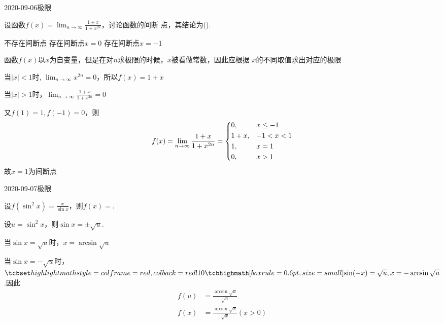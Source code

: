 \documentclass{ctexart}
\begin{document}
\begin{mathques}{2020-09-06}{极限}
\begin{ques}
  设函数$f(x) = \lim_{n \to \infty} \frac{1 + x}{1 + x^{2n}}$，讨论函数的间断
  点，其结论为(\quad).
  \begin{multichoice}
    \task 不存在间断点
    \task {}
    \task 存在间断点$x = 0$
    \task 存在间断点$x = -1$
  \end{multichoice}
\end{ques}
\begin{solu}
\begin{mathideabox}
  函数$f(x)$以$x$为自变量，但是在对$n$求极限的时候，$x$被看做常数，因此应根据
  $x$的不同取值求出对应的极限
\end{mathideabox}
当$|x| < 1$时, $\lim_{n \to \infty} x^{2n} = 0$，所以$f(x) = 1 + x$

当$|x| > 1$时，$\lim_{n \to \infty} \frac{1 + x}{1 + x^{2n}} = 0$

又$f(1) = 1, f(-1) = 0$，则
\[
  f(x) = \lim_{n \to \infty} \frac{1 + x}{1 + x^{2n}} =
  \begin{dcases}
    0,     & x \le -1 \\
    1 + x, & -1 <x < 1 \\
    1,     & x = 1 \\
    0,     & x > 1 \\
  \end{dcases}
\]
故$x = 1$为间断点
\end{solu}
\end{mathques}

\begin{mathques}{2020-09-07}{极限}
\begin{ques}
  设$f(\sin^2x) = \frac{x}{\sin x}$，则$f(x) = $\mathblank.
\end{ques}
\begin{solu}
  \par
  设$u = \sin^2 x$，则$\sin x = \pm \sqrt{u}$.

  当$\sin x = \sqrt{u}$时，$x = \arcsin \sqrt{u}$

  当$\sin x = - \sqrt{u}$时，$\matherror{\sin(-x) = \sqrt{u}, x = -\arcsin
  \sqrt{u}}$.因此
  \begin{align*}
    f(u) &= \frac{\arcsin \sqrt{u}}{\sqrt{u}} \\
    f(x) &= \frac{\arcsin \sqrt{x}}{\sqrt{x}} (x > 0)
  \end{align*}
\end{solu}
\end{mathques}
\end{document}
